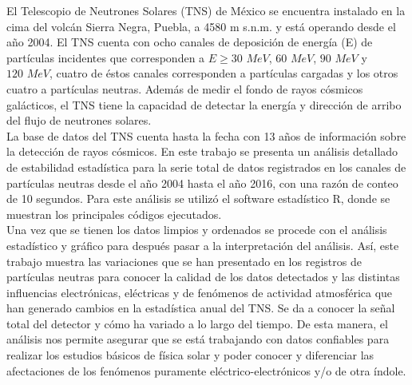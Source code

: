 



\begin{abstracts}        %

El Telescopio de Neutrones Solares (TNS) de México se encuentra instalado en la cima del volcán Sierra Negra, Puebla, a 4580 m s.n.m. y está operando desde el año 2004. El TNS cuenta con ocho canales de deposición de energía (E) de partículas incidentes que corresponden a $E\geq 30 \,\, MeV$, $60 \,\, MeV$, $90 \,\, MeV$ y $120 \,\, MeV$, cuatro de éstos canales corresponden a partículas cargadas y los otros cuatro a partículas neutras. Además de medir el fondo de rayos cósmicos galácticos, el TNS tiene la capacidad de detectar la energía y dirección de arribo del flujo de neutrones solares.\\

La base de datos del TNS cuenta hasta la fecha con 13 años de información sobre la detección de rayos cósmicos. En este trabajo se presenta un análisis detallado de estabilidad estadística para la serie total de datos registrados en los canales de partículas neutras desde el año 2004 hasta el año 2016, con una razón de conteo de 10 segundos. Para este análisis se utilizó el software estadístico R, donde se muestran los principales códigos ejecutados.\\

Una vez que se tienen los datos limpios y ordenados se procede con el análisis estadístico y gráfico para después pasar a la interpretación del análisis. Así, este trabajo muestra las variaciones que se han presentado en los registros de partículas neutras para conocer la calidad de los datos detectados y las distintas influencias electrónicas, eléctricas y de fenómenos de actividad atmosférica que han generado cambios en la estadística anual del TNS. Se da a conocer la señal total del detector y cómo ha variado a lo largo del tiempo. De esta manera, el análisis nos permite asegurar que se está trabajando con datos confiables para realizar los estudios básicos de física solar y poder conocer y diferenciar las afectaciones de los fenómenos puramente eléctrico-electrónicos y/o de otra índole.


\end{abstracts}


